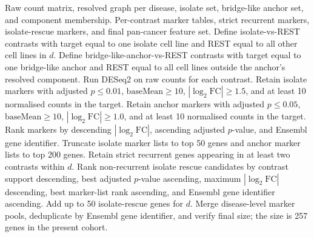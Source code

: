 \begin{algorithm}[H]
\caption{Marker-gene selection, recurrence filtering, and pan-cancer feature construction}
\label{alg:supp_marker_recurrence_pan_cancer_features}
\small
\begin{algorithmic}[1]
\Require Raw count matrix, resolved graph per disease, isolate set, bridge-like anchor set, and component membership.
\Ensure Per-contrast marker tables, strict recurrent markers, isolate-rescue markers, and final pan-cancer feature set.
  \State Define isolate-vs-REST contrasts with target equal to one isolate cell line and REST equal to all other cell lines in \(d\).
  \State Define bridge-like-anchor-vs-REST contrasts with target equal to one bridge-like anchor and REST equal to all cell lines outside the anchor's resolved component.
  \State Run DESeq2 on raw counts for each contrast.
  \State Retain isolate markers with adjusted \(p\leq0.01\), \(\mathrm{baseMean}\geq10\), \(|\log_2\mathrm{FC}|\geq1.5\), and at least 10 normalised counts in the target.
  \State Retain anchor markers with adjusted \(p\leq0.05\), \(\mathrm{baseMean}\geq10\), \(|\log_2\mathrm{FC}|\geq1.0\), and at least 10 normalised counts in the target.
  \State Rank markers by descending \(|\log_2\mathrm{FC}|\), ascending adjusted \(p\)-value, and Ensembl gene identifier.
  \State Truncate isolate marker lists to top 50 genes and anchor marker lists to top 200 genes.
  \State Retain strict recurrent genes appearing in at least two contrasts within \(d\).
  \State Rank non-recurrent isolate rescue candidates by contrast support descending, best adjusted \(p\)-value ascending, maximum \(|\log_2\mathrm{FC}|\) descending, best marker-list rank ascending, and Ensembl gene identifier ascending.
  \State Add up to 50 isolate-rescue genes for \(d\).
\EndFor
\State Merge disease-level marker pools, deduplicate by Ensembl gene identifier, and verify final size; the size is 257 genes in the present cohort.
\end{algorithmic}
\end{algorithm}

